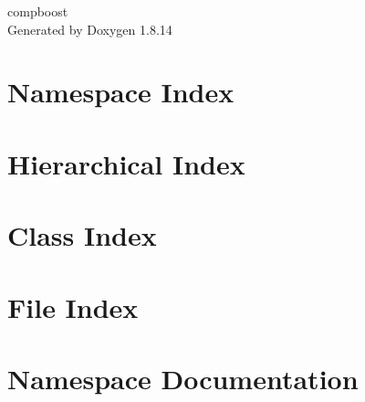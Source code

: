 \documentclass[twoside]{book}
\newcommand{\+}{\discretionary{\mbox{\scriptsize$\hookleftarrow$}}{}{}}
\newcommand{\clearemptydoublepage}{%
  \newpage{\pagestyle{empty}\cleardoublepage}%
}
\begin{document}
\hypersetup{pageanchor=false,
             bookmarksnumbered=true,
             pdfencoding=unicode
            }
\begin{titlepage}
\vspace*{7cm}
\begin{center}%
{\Large compboost }\\
\vspace*{1cm}
{\large Generated by Doxygen 1.8.14}\\
\end{center}
\end{titlepage}
\clearemptydoublepage
{}
\tableofcontents
\clearemptydoublepage
{}
\hypersetup{pageanchor=true}

\chapter{Namespace Index}

\chapter{Hierarchical Index}

\chapter{Class Index}

\chapter{File Index}

\chapter{Namespace Documentation}










\end{document}
